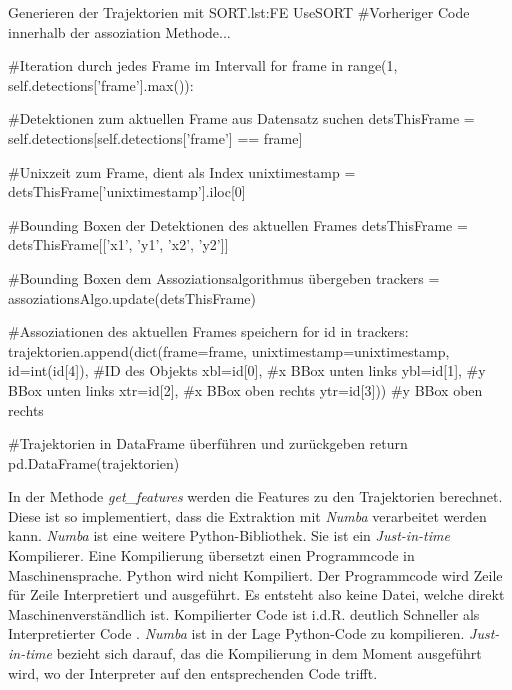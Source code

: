 \begin{pythoncode}{Generieren der Trajektorien mit SORT.}{lst:FE UseSORT}
#Vorheriger Code innerhalb der assoziation Methode...

#Iteration durch jedes Frame im Intervall
for frame in range(1, self.detections['frame'].max()):
    
    #Detektionen zum aktuellen Frame aus Datensatz suchen
    detsThisFrame = self.detections[self.detections['frame'] == frame]

    #Unixzeit zum Frame, dient als Index
    unixtimestamp = detsThisFrame['unixtimestamp'].iloc[0]

    #Bounding Boxen der Detektionen des aktuellen Frames
    detsThisFrame = detsThisFrame[['x1', 'y1', 'x2', 'y2']] 

    #Bounding Boxen dem Assoziationsalgorithmus übergeben
    trackers = assoziationsAlgo.update(detsThisFrame) 

    #Assoziationen des aktuellen Frames speichern 
    for id in trackers:
        trajektorien.append(dict(frame=frame,
                          unixtimestamp=unixtimestamp, 
                          id=int(id[4]),    #ID des Objekts
                          xbl=id[0],        #x BBox unten links
                          ybl=id[1],        #y BBox unten links
                          xtr=id[2],        #x BBox oben rechts
                          ytr=id[3]))       #y BBox oben rechts

    #Trajektorien in DataFrame überführen und zurückgeben
    return pd.DataFrame(trajektorien)
\end{pythoncode}

In der Methode \textit{get\_features} werden die Features zu den Trajektorien berechnet. Diese ist so implementiert, dass die Extraktion mit \textit{Numba} verarbeitet werden kann. \textit{Numba} ist eine weitere Python-Bibliothek. Sie ist ein \textit{\gls{Just-in-time}} Kompilierer. Eine Kompilierung übersetzt einen Programmcode in Maschinensprache. Python wird nicht Kompiliert. Der Programmcode wird Zeile für Zeile Interpretiert und ausgeführt. Es entsteht also keine Datei, welche direkt Maschinenverständlich ist. Kompilierter Code ist i.d.R. deutlich Schneller als Interpretierter Code . \textit{Numba} ist in der Lage Python-Code zu kompilieren. \textit{Just-in-time} bezieht sich darauf, das die Kompilierung in dem Moment ausgeführt wird, wo der Interpreter auf den entsprechenden Code trifft. \par

